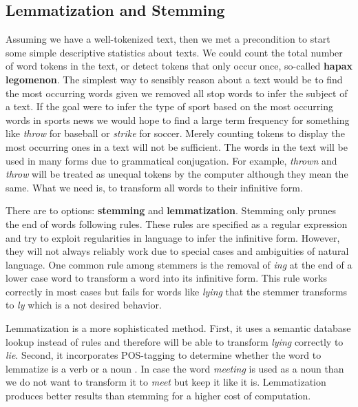 \subsection{Lemmatization and Stemming}\label{stemming}
Assuming we have a well-tokenized text, then we met a precondition to start some simple descriptive statistics about texts.
We could count the total number of word tokens in the text, or detect tokens that only occur once, so-called \textbf{hapax legomenon}.
The simplest way to sensibly reason about a text would be to find the most occurring words given we removed all stop words to infer the subject of a text.
If the goal were to infer the type of sport based on the most occurring words in sports news we would hope to find a large term frequency for something like \textit{throw} for baseball or \textit{strike} for soccer.
Merely counting tokens to display the most occurring ones in a text will not be sufficient.
The words in the text will be used in many forms due to grammatical conjugation.
For example, \textit{thrown} and \textit{throw} will be treated as unequal tokens by the computer although they mean the same.
What we need is, to transform all words to their infinitive form.

There are to options: \textbf{stemming} and \textbf{lemmatization}.
Stemming only prunes the end of words following rules.
These rules are specified as a regular expression and try to exploit regularities in language to infer the infinitive form.
However, they will not always reliably work due to special cases and ambiguities of natural language.
One common rule among stemmers is the removal of \textit{ing} at the end of a lower case word to transform a word into its infinitive form. This rule works correctly in most cases but fails for words like \textit{lying} that the stemmer transforms to \textit{ly} which is a not desired behavior.

Lemmatization is a more sophisticated method.
First, it uses a semantic database lookup instead of rules and therefore will be able to transform \textit{lying} correctly to \textit{lie}.
Second, it incorporates POS-tagging to determine whether the word to lemmatize is a verb or a noun \citep{Muller2015}.
In case the word \textit{meeting} is used as a noun than we do not want to transform it to \textit{meet} but keep it like it is. Lemmatization produces better results than stemming \citep{Balakrishnan2014}  for a higher cost of computation.


